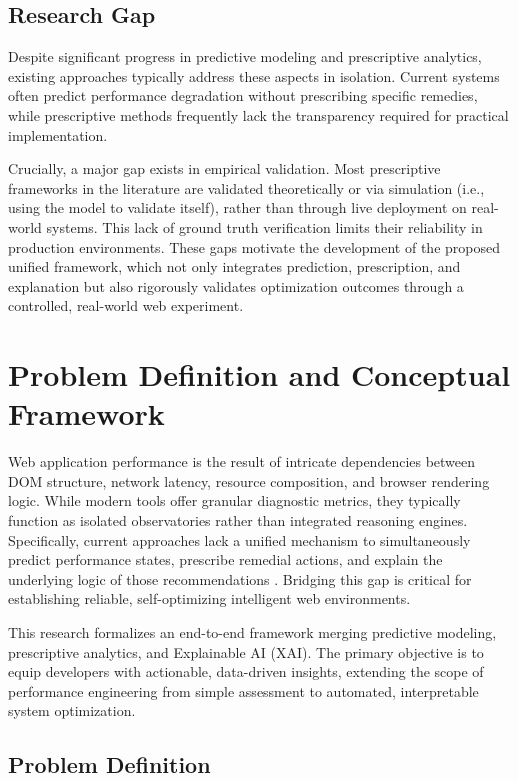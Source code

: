 \documentclass[sn-nature]{sn-jnl}
\begin{document}
\subsection{Research Gap}

Despite significant progress in predictive modeling and prescriptive analytics, existing approaches typically address these aspects in isolation. Current systems often predict performance degradation without prescribing specific remedies, while prescriptive methods frequently lack the transparency required for practical implementation.

Crucially, a major gap exists in empirical validation. Most prescriptive frameworks in the literature are validated theoretically or via simulation (i.e., using the model to validate itself), rather than through live deployment on real-world systems. This lack of ground truth verification limits their reliability in production environments. These gaps motivate the development of the proposed unified framework, which not only integrates prediction, prescription, and explanation but also rigorously validates optimization outcomes through a controlled, real-world web experiment.


\section{Problem Definition and Conceptual Framework}\label{sec3}

Web application performance is the result of intricate dependencies between DOM structure, network latency, resource composition, and browser rendering logic. While modern tools offer granular diagnostic metrics, they typically function as isolated observatories rather than integrated reasoning engines. Specifically, current approaches lack a unified mechanism to simultaneously predict performance states, prescribe remedial actions, and explain the underlying logic of those recommendations \cite{ghattas2025, vanriet2023}. Bridging this gap is critical for establishing reliable, self-optimizing intelligent web environments.

This research formalizes an end-to-end framework merging predictive modeling, prescriptive analytics, and Explainable AI (XAI). The primary objective is to equip developers with actionable, data-driven insights, extending the scope of performance engineering from simple assessment \cite{mathur2024} to automated, interpretable system optimization.

\subsection{Problem Definition}
\end{document}
